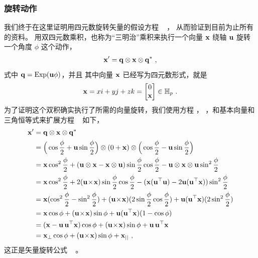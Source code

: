 \subsubsection{旋转动作}
\label{sec:qRotAction}

我们终于在这里证明用四元数旋转矢量的假设方程 ~ ，  
从而验证到目前为止所有的资料。
%
用双四元数乘积，也称为“三明治”乘积来执行一个向量 ${\bf x}$ 绕轴 ${\bf u}$ 旋转一个角度 $\phi$ 这个动作，
%
\begin{align}
{\bf x}' = {\bf q}\otimes{\bf x}\otimes{\bf q}^* ~, \label{equ:sandwichProd}
\end{align}
%
式中 ${\bf q}=\operatorname*{Exp}({\bf u}\phi)$，并且
其中向量 ${\bf x}$ 已经写为四元数形式，就是 
%
\begin{align}
{\bf x}= x i + y j + z k = \begin{bmatrix}
0 \\ {\bf x}
\end{bmatrix} \in {\mathbb H}_p
~. \label{equ:quatvec}
\end{align}%
%
%
为了证明这个双积确实执行了所需的向量旋转，我们使用方程  ，
，和基本向量和三角恒等式来扩展方程 ~ 如下，
%
\begin{align}\label{equ:quatRotFormula}
\begin{split}
\bfx'
&= \bfq \ot \bfx \ot \bfq^* \\
&= \Big(\cos \frac{\phi}{2} + \bfu \sin \frac{\phi}{2}\Big)
 \ot (0+\bfx)
 \ot \Big(\cos \frac{\phi}{2} - \bfu \sin \frac{\phi}{2}\Big)
 \\
&= \bfx \cos^2 \frac{\phi}{2} + (\bfu\ot\bfx - \bfx\ot\bfu) \sin \frac{\phi}{2} \cos \frac{\phi}{2} - \bfu\ot\bfx\ot\bfu \sin^2 \frac{\phi}{2} \\
&= \bfx \cos^2 \frac{\phi}{2} + 2 (\bfu \tcross \bfx) \sin \frac{\phi}{2} \cos \frac{\phi}{2} - (\bfx (\bfu \tr \bfu) - 2 \bfu (\bfu \tr \bfx)) \sin^2 \frac{\phi}{2} \\
&= \bfx (\cos^2 \frac{\phi}{2} - \sin^2 \frac{\phi}{2}) + (\bfu \tcross \bfx) (2\sin\frac{\phi}{2} \cos\frac{\phi}{2}) + \bfu (\bfu \tr \bfx) (2\sin^2 \frac{\phi}{2}) \\
&= \bfx \cos \phi + (\bfu \tcross \bfx) \sin \phi + \bfu (\bfu \tr \bfx) (1 - \cos \phi) \\
&= (\bfx - \bfu \,\bfu \tr \bfx) \cos \phi + (\bfu \tcross \bfx) \sin \phi + \bfu \,\bfu \tr \bfx \\
&= \bfx_{\bot} \cos \phi + (\bfu \tcross \bfx) \sin \phi + \bfx_{||} ~,
\end{split}
\end{align}%
%
这正是矢量旋转公式 ~ 。


